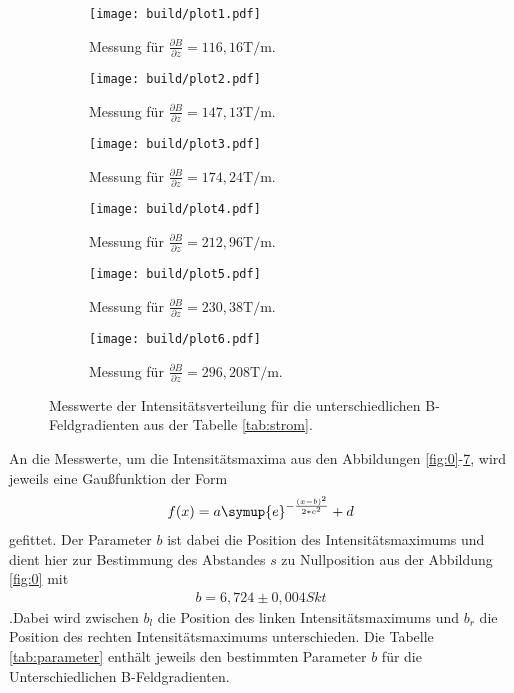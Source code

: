 \begin{figure}
   \centering
   \begin{subfigure}{0.48\textwidth}
      \texttt{[image: build/plot1.pdf]}
      \caption{Messung für $\frac{\partial B}{\partial z}=116,16\si{\tesla\per\meter}$. }
      \label{fig:mess1}
     \end{subfigure}
     \begin{subfigure}{0.48\textwidth}
       \texttt{[image: build/plot2.pdf]}
       \caption{Messung für $\frac{\partial B}{\partial z}=  147,13\si{\tesla\per\meter}$. }
       \label{fig:mess2}
     \end{subfigure}
     \begin{subfigure}{0.48\textwidth}
       \texttt{[image: build/plot3.pdf]}
       \caption{Messung für $\frac{\partial B}{\partial z}=174,24\si{\tesla\per\meter}$. }
       \label{fig:mess3}
     \end{subfigure}
     \begin{subfigure}{0.48\textwidth}
       \texttt{[image: build/plot4.pdf]}
       \caption{Messung für $\frac{\partial B}{\partial z}=212,96\si{\tesla\per\meter}$. }
       \label{fig:mess4}
     \end{subfigure}
     \begin{subfigure}{0.48\textwidth}
       \texttt{[image: build/plot5.pdf]}
       \caption{Messung für $\frac{\partial B}{\partial z}=230,38\si{\tesla\per\meter}$. }
       \label{fig:mess5}
     \end{subfigure}
     \begin{subfigure}[width=1\textwidth]{0.48\textwidth}
       \texttt{[image: build/plot6.pdf]}
       \caption{Messung für $\frac{\partial B}{\partial z}=296,208\si{\tesla\per\meter}$. }
       \label{fig:mess6}
     \end{subfigure}
     \caption{Messwerte der Intensitätsverteilung für die unterschiedlichen B-Feldgradienten aus der Tabelle \ref{tab:strom}.}
    \label{fig:mess_all}
\end{figure}

An die Messwerte, um die Intensitätsmaxima aus den Abbildungen
\ref{fig:0}-\ref{fig:mess_all}, wird jeweils eine
Gaußfunktion der Form
\begin{align}
  f(x)=a\symup{e}^{-\frac{(x-b)^2}{2*c^2}}+d
\end{align}
gefittet. Der Parameter $b$ ist dabei die
Position des Intensitätsmaximums und dient hier zur Bestimmung
des Abstandes $s$ zu Nullposition aus
der Abbildung \ref{fig:0} mit
\begin{align}
b= 6,724\pm0,004 Skt
\end{align}
.Dabei wird zwischen
$b_l$ die Position des linken Intensitätsmaximums und
$b_r$ die Position des rechten Intensitätsmaximums
unterschieden. Die
Tabelle \ref{tab:parameter}
enthält jeweils den bestimmten Parameter
$b$ für die Unterschiedlichen B-Feldgradienten.

